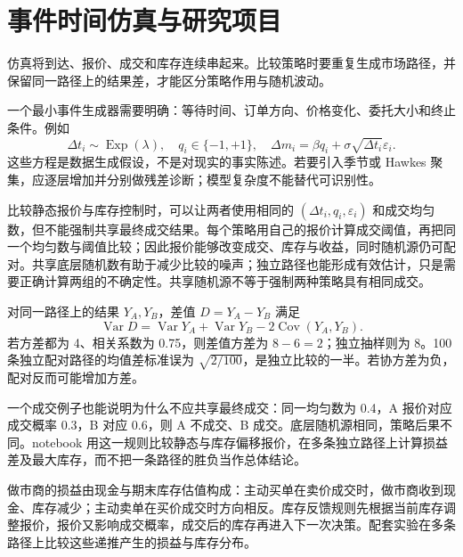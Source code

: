 \section{事件时间仿真与研究项目}
\label{ch:lower-microstructure-simulation}

\begin{itemize}
  
\end{itemize}

仿真将到达、报价、成交和库存连续串起来。比较策略时要重复生成市场路径，并保留同一路径上的结果差，才能区分策略作用与随机波动。





一个最小事件生成器需要明确：等待时间、订单方向、价格变化、委托大小和终止条件。例如
\[
 \Delta t_i\sim\operatorname{Exp}(\lambda),\quad
 q_i\in\{-1,+1\},\quad
 \Delta m_i=\beta q_i+\sigma\sqrt{\Delta t_i}\varepsilon_i.
\]
这些方程是数据生成假设，不是对现实的事实陈述。若要引入季节或 Hawkes 聚集，应逐层增加并分别做残差诊断；模型复杂度不能替代可识别性。

比较静态报价与库存控制时，可以让两者使用相同的 $(\Delta t_i,q_i,\varepsilon_i)$ 和成交均匀数，但不能强制共享最终成交结果。每个策略用自己的报价计算成交阈值，再把同一个均匀数与阈值比较；因此报价能够改变成交、库存与收益，同时随机源仍可配对。共享底层随机数有助于减少比较的噪声；独立路径也能形成有效估计，只是需要正确计算两组的不确定性。共享随机源不等于强制两种策略具有相同成交。


对同一路径上的结果 $Y_A,Y_B$，差值 $D=Y_A-Y_B$ 满足
\[
 \operatorname{Var}D=\operatorname{Var}Y_A+\operatorname{Var}Y_B
 -2\operatorname{Cov}(Y_A,Y_B).
\]
若方差都为 4、相关系数为 0.75，则差值方差为 $8-6=2$；独立抽样则为 8。100 条独立配对路径的均值差标准误为 $\sqrt{2/100}$，是独立比较的一半。若协方差为负，配对反而可能增加方差。

一个成交例子也能说明为什么不应共享最终成交：同一均匀数为 0.4，A 报价对应成交概率 0.3，B 对应 0.6，则 A 不成交、B 成交。底层随机源相同，策略后果不同。notebook 用这一规则比较静态与库存偏移报价，在多条独立路径上计算损益差及最大库存，而不把一条路径的胜负当作总体结论。

做市商的损益由现金与期末库存估值构成：主动买单在卖价成交时，做市商收到现金、库存减少；主动卖单在买价成交时方向相反。库存反馈规则先根据当前库存调整报价，报价又影响成交概率，成交后的库存再进入下一次决策。配套实验在多条路径上比较这些递推产生的损益与库存分布。

